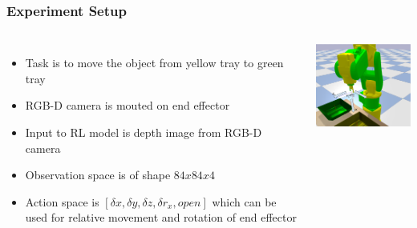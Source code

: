 \documentclass{beamer}
\begin{document}
	\begin{frame}
		\frametitle{Experiment Setup}
		
		\begin{columns}[c]
			\begin{itemize}
				\item Task is to move the object from yellow tray to green tray
				\item RGB-D camera is mouted on end effector
				\item Input to RL model is depth image from RGB-D camera
				\item Observation space is of shape $84x84x4$
				\item Action space is $[\delta x, \delta y, \delta z, \delta r_x, open]$ which can be used for relative movement and rotation of end effector 
			\end{itemize}
			
			\includegraphics[width=6cm]{action-space.png}
		\end{columns}
	\end{frame}
\end{document}

